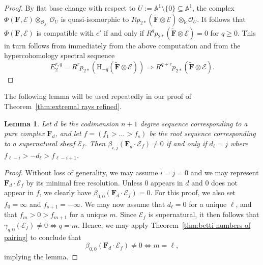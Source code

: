 \documentclass[12pt]{amsart}
\newtheorem{lemma}{Lemma}[section]
\theoremstyle{definition}
\theoremstyle{remark}
\newcommand{\kk}{\Bbbk}
\renewcommand{\AA}{\mathbb{A}}
\newcommand{\HH}{\mathrm{H}}
\newcommand{\cc}{c}
\newcommand{\dd}{d}
\newcommand{\cO}{\mathcal{O}}
\newcommand{\cE}{\mathcal{E}}
\newcommand{\FF}{\mathbf{F}}
\begin{document}
\begin{proof}
By flat base change with respect to $U:=\AA^1\setminus \{0\} \subseteq \AA^1$, the complex $\Phi(\FF,\cE)\otimes_{\cO_{\AA^1}} \cO_{U}$ is quasi-isomorphic to $Rp_{2*}\left(\widetilde{\FF}\otimes \cE\right)\otimes_{\kk} \cO_{U}$.  It follows that $\Phi(\FF,\cE)$ is compatible with $\cc'$ if and only if $R^qp_{2*}\left(\widetilde{\FF}\otimes \cE\right)=0$ for $q\geq 0$.  This in turn follows from immediately from the above computation and from the hypercohomology spectral sequence
\[
E_2^{r,q}=R^{r}p_{2*}(\HH_{-q}(\widetilde{\FF}\otimes \cE))\Rightarrow R^{q+r}p_{2*}(\widetilde{\FF}\otimes \cE).
\]
\end{proof}


The following lemma will be used repeatedly in our proof of Theorem~\ref{thm:extremal rays refined}.
\begin{lemma}\label{lem:pure and supernatural}
Let $\dd$ be the codimension $n+1$ degree sequence corresponding to a pure complex $\FF_d$, and let $f=(f_1>\dots >f_s)$ be the root sequence corresponding to a supernatural sheaf $\cE_f$.  Then
$
\beta_{i,j}(\FF_d\cdot \cE_f)\ne 0
$
if and only if $d_\ell=j$ where $f_{\ell-i}>-d_{\ell}>f_{\ell-i+1}$.\end{lemma}
\begin{proof}
Without loss of generality, we may assume $i=j=0$ and we may represent $\FF_d\cdot \cE_f$ by its minimal free resolution. Unless $0$ appears in $\dd$ and $0$ does not appear in $f$, we clearly have $\beta_{0,0}(\FF_d\cdot \cE_f)=0$.  For this proof, we also set $f_0=\infty$ and $f_{s+1}=-\infty$. We may now assume that $d_{\ell}=0$ for a unique $\ell$, and that $f_m>0>f_{m+1}$ for a unique $m$.
Since $\cE_f$ is supernatural, it then follows that $\gamma_{q,0}(\cE_f)\ne 0 \iff q=m$.  Hence, we may apply Theorem~\ref{thm:betti numbers of pairing} to conclude that
\[
\beta_{0,0}(\FF_d\cdot \cE_f)\ne 0 \iff m=\ell,
\]
implying the lemma.
\end{proof}
\end{document}
